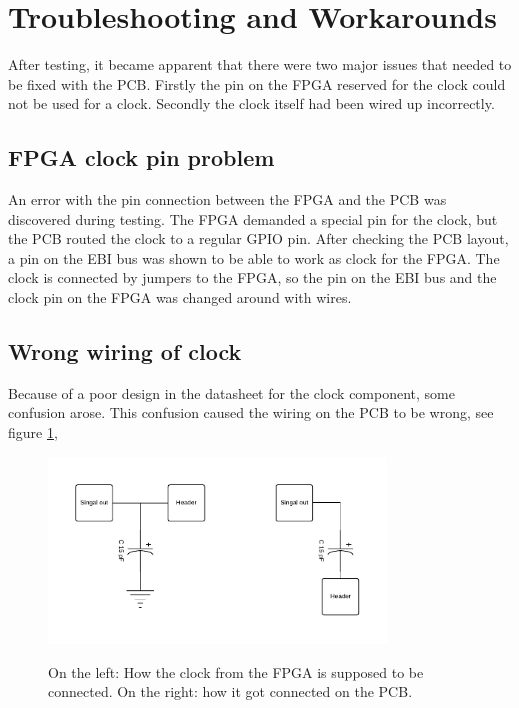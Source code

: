 \documentclass[../main/report.tex]{subfiles}
\begin{document}
\section{Troubleshooting and Workarounds}

After testing, it became apparent that there were two major issues that needed to be fixed with the PCB.
Firstly the pin on the FPGA reserved for the clock could not be used for a clock.
Secondly the clock itself had been wired up incorrectly.

\subsection*{FPGA clock pin problem}
An error with the pin connection between the FPGA and the PCB was discovered during testing.
The FPGA demanded a special pin for the clock, but the PCB routed the clock to a regular GPIO pin.
After checking the PCB layout, a pin on the EBI bus was shown to be able to work as clock for the FPGA.
The clock is connected by jumpers to the FPGA, so the pin on the EBI bus and the clock pin on the FPGA was changed around with wires.

\subsection*{Wrong wiring of clock}

Because of a poor design in the datasheet for the clock component, some confusion arose.
This confusion caused the wiring on the PCB to be wrong, see figure \ref{fig:pcb-clock},

\begin{figure}[H]
    \centering
    \includegraphics[width=0.8\textwidth]{../pcb/assets/pcb-clock.pdf}
    \label{fig:pcb-clock}
    \caption{On the left: How the clock from the FPGA is supposed to be connected.
             On the right: how it got connected on the PCB.}
\end{figure}
\end{document}
